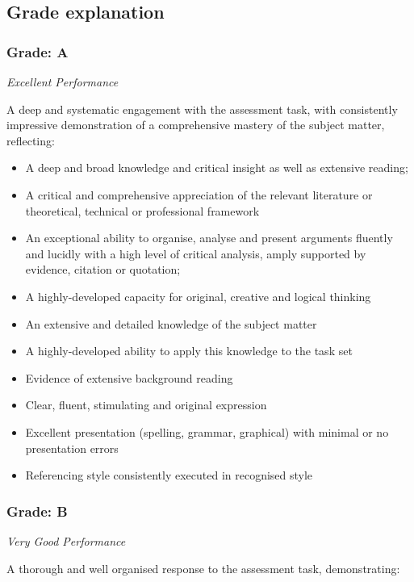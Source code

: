 
\subsection*{Grade explanation}

\subsubsection*{Grade: A}

\textit{Excellent Performance}

A deep and systematic engagement with the assessment task, with consistently impressive demonstration of a comprehensive mastery of the subject matter, reflecting:

\begin{itemize}
	\item A deep and broad knowledge and critical insight as well as extensive reading;
	\item A critical and comprehensive appreciation
	of the relevant literature or theoretical, technical or professional framework
	\item An exceptional ability to organise, analyse and present arguments fluently and lucidly with a high level of critical analysis, amply supported by evidence, citation or quotation;
	\item A highly-developed capacity for original,
	creative and logical thinking
	\item An extensive and detailed knowledge of the subject matter
	\item A highly-developed ability to apply this knowledge to the task set
	\item Evidence of extensive background reading
	\item Clear, fluent, stimulating and original expression
	\item Excellent presentation (spelling, grammar, graphical) with minimal or no presentation errors
	\item Referencing style consistently executed in recognised style
\end{itemize}


\subsubsection*{Grade: B}

\textit{Very Good Performance}

A thorough and well organised response to the assessment task, demonstrating:

